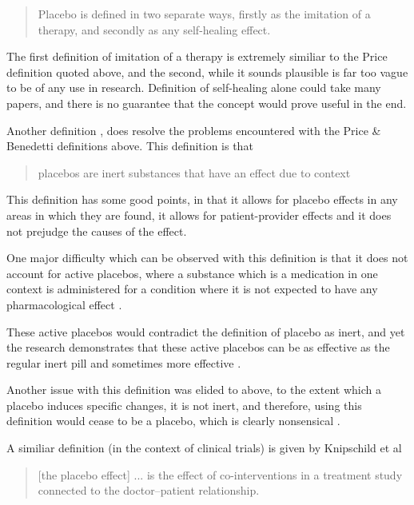 \begin{quotation}
Placebo is defined in two separate ways, firstly as the imitation of a
therapy, and secondly as any self-healing effect. 
\end{quotation}

The first definition of imitation of a therapy is extremely similiar to the Price definition quoted above, and the second, while it sounds plausible is far too vague to be of any use in research. Definition of self-healing alone could take many papers, and there is no guarantee that the concept would prove useful in the end. 

Another definition \cite{Blasi2001}, does resolve the problems encountered with the Price \& Benedetti  definitions above. This definition is that

\begin{quotation}
  placebos are inert substances that have an effect due to context
\end{quotation}

This definition has some good points, in that it allows for placebo effects in any areas in which they are found, it allows for patient-provider effects and it does not prejudge the causes of the effect. 

One major difficulty which can be observed with this definition is that it does not account for active placebos, where a substance which is a medication in one context is administered for a condition where it is not expected to have any pharmacological effect\cite{Kirsch1998} . 

These active placebos would contradict the definition of placebo as inert, and yet the research demonstrates that these active placebos can be as effective as the regular inert pill \cite{Flaten2004} and sometimes more effective \cite{Kirsch2002a}. 

Another issue with this definition was elided to above, to the extent which a placebo induces specific changes, it is not inert, and therefore, using this definition would cease to be a placebo, which is clearly nonsensical \cite{Moerman2002b}.

A similiar definition (in the context of clinical trials) is given by Knipschild et al \cite{Knipschild2005}

\begin{quotation}
  [the placebo effect] ... is the effect of co-interventions in a
treatment study connected to the doctor--patient relationship.
\end{quotation}


